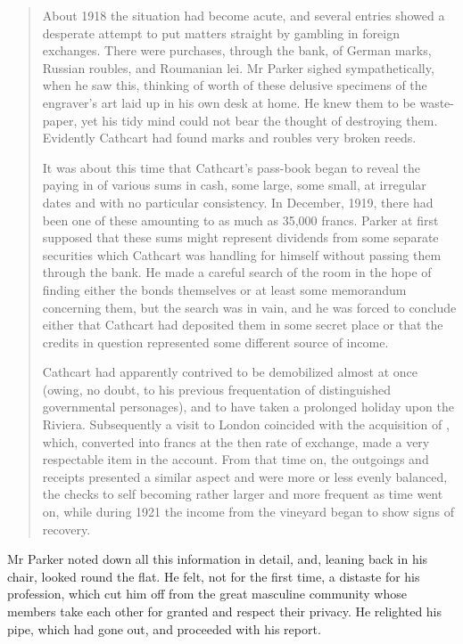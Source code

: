 \begin{quotation}
About 1918 the situation had become acute, and several entries showed a desperate attempt to put matters straight by gambling in foreign exchanges. There were purchases, through the bank, of German marks, Russian roubles, and Roumanian lei. Mr Parker sighed sympathetically, when he saw this, thinking of  worth of these delusive specimens of the engraver's art laid up in his own desk at home. He knew them to be waste-paper, yet his tidy mind could not bear the thought of destroying them. Evidently Cathcart had found marks and roubles very broken reeds.

It was about this time that Cathcart's pass-book began to reveal the paying in of various sums in cash, some large, some small, at irregular dates and with no particular consistency. In December, 1919, there had been one of these amounting to as much as 35,000 francs.  Parker at first supposed that these sums might represent dividends from some separate securities which Cathcart was handling for himself without passing them through the bank. He made a careful search of the room in the hope of finding either the bonds themselves or at least some memorandum concerning them, but the search was in vain, and he was forced to conclude either that Cathcart had deposited them in some secret place or that the credits in question represented some different source of income.

Cathcart had apparently contrived to be demobilized almost at once (owing, no doubt, to his previous frequentation of distinguished governmental personages), and to have taken a prolonged holiday upon the Riviera. Subsequently a visit to London coincided with the acquisition of , which, converted into francs at the then rate of exchange, made a very respectable item in the account. From that time on, the outgoings and receipts presented a similar aspect and were more or less evenly balanced, the checks to self becoming rather larger and more frequent as time went on, while during 1921 the income from the vineyard began to show signs of recovery.

\end{quotation}

Mr Parker noted down all this information in detail, and, leaning back in his chair, looked round the flat. He felt, not for the first time, a distaste for his profession, which cut him off from the great masculine community whose members take each other for granted and respect their privacy. He relighted his pipe, which had gone out, and proceeded with his report.

